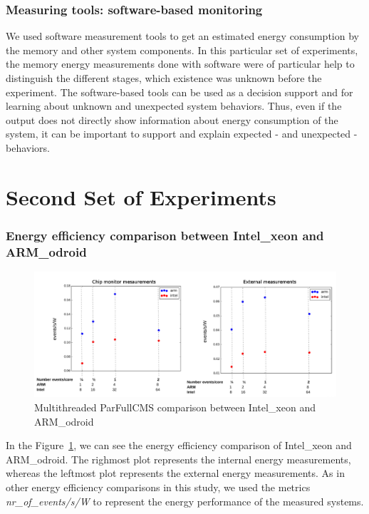 \subsubsection*{Measuring tools: software-based monitoring}
We used software measurement tools to get an estimated energy consumption by the memory and other system components. In this particular set of experiments, the memory energy measurements done with software were
of particular help to distinguish the different stages, which existence was
unknown before the experiment. The software-based tools can be used as a 
decision support and for learning about unknown and unexpected system behaviors. Thus, even if the output
does not directly show information about energy consumption of the system, it
can be important to support and explain expected - and unexpected - behaviors.
  

\section{Second Set of Experiments}
\subsubsection*{Energy efficiency comparison between Intel\_xeon and ARM\_odroid}

\begin{figure}[h]
  \centering
    \includegraphics[width=150mm]{"img/acat/results1"}
    \caption{Multithreaded ParFullCMS comparison between Intel\_xeon and ARM\_odroid}
    \label{fig:parfull_results}
\end{figure}

In the Figure~\ref{fig:parfull_results}, we can see the energy efficiency comparison of Intel\_xeon and ARM\_odroid. The righmost plot represents the internal energy measurements, whereas the leftmost plot represents the external energy measurements. As in other energy efficiency comparisons in this study, we used the metrics \textit{nr\_of\_events/s/W} to represent the energy performance of the measured systems. 


